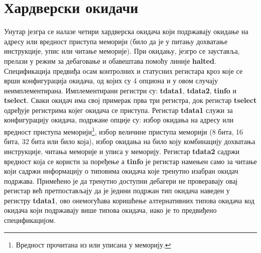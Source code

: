 \section{Хардверски окидачи}

Унутар језгра се налазе четири хардверска окидача који подржавају окидање на адресу или вредност приступа меморији (било да је у питању дохватање инструкције, упис или читање меморије). При окидању, језгро се зауставља, прелази у режим за дебаговање и обавештава  помоћу линије \textbf{halted}. Спецификација предвиђа осам контролних и статусних регистара кроз које се врши конфигурација окидача, од којих су 4 опциона и у овом случају неимплементирана. 
Имплементирани регистри су: \textbf{tdata1}, \textbf{tdata2}, \textbf{tinfo} и \textbf{tselect}. Сваки окидач има свој примерак прва три регистра, док регистар \textbf{tselect} одређује регистрима којег окидача се приступа. Регистар \textbf{tdata1} служи за конфигурацију окидача, подржане опције су: избор окидања на адресу или вредност приступа меморији\footnote{Вредност прочитана из или уписана у меморију.}, избор величине приступа меморији (8 бита, 16 бита, 32 бита или било која), избор окидања на било коју комбинацију дохватања инструкције, читања меморије и уписа у меморију. Регистар \textbf{tdata2} садржи вредност која се користи за поређење а \textbf{tinfo} је регистар намењен само за читање који садржи информацију о типовима окидача које тренутно изабран окидач подржава. Примећено је да тренутно доступни дебагери не проверавају овај регистар већ претпостављају да је једини подржан тип окидача наведен у регистру \textbf{tdata1}, ово онемогућава коришћење алтернативних типова окидача код окидача који подржавају више типова окидача, иако је то предвиђено спецификацијом.

